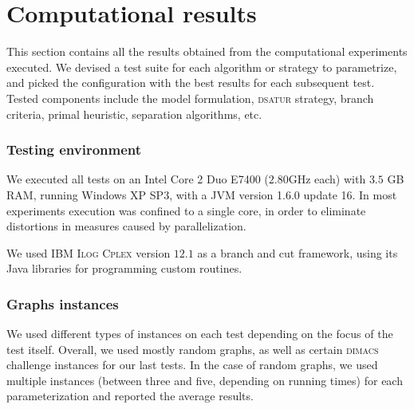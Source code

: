 
\section{Computational results}
\label{sec:results}

This section contains all the results obtained from the computational experiments executed. We devised a test suite for each algorithm or strategy to parametrize, and picked the configuration with the best results for each subsequent test. Tested components include the model formulation, \textsc{dsatur} strategy, branch criteria, primal heuristic, separation algorithms, etc.

\subsubsection{Testing environment}

We executed all tests on an Intel Core 2 Duo E7400 ($2.80$GHz each) with $3.5$ GB RAM, running Windows XP SP3, with a JVM version 1.6.0 update 16. In most experiments execution was confined to a single core, in order to eliminate distortions in measures caused by parallelization.

We used \textsc{IBM Ilog Cplex} version $12.1$ as a branch and cut framework, using its Java libraries for programming custom routines.

\subsubsection{Graphs instances}

We used different types of instances on each test depending on the focus of the test itself. Overall, we used mostly random graphs, as well as certain \textsc{dimacs} challenge instances\cite{dimacs} for our last tests. In the case of random graphs, we used multiple instances (between three and five, depending on running times) for each parameterization and reported the average results.  

